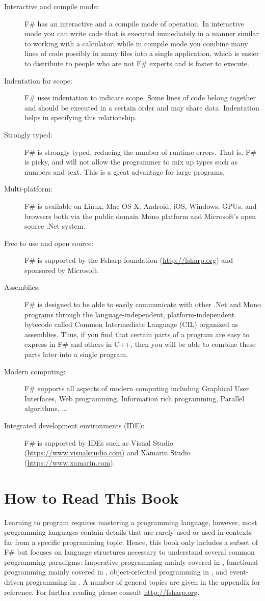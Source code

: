 \documentclass[springer.tex]{subfiles}
\begin{document}
\begin{description}
\item[Interactive and compile mode:] F\# has an interactive and a compile mode of operation. In interactive mode you can write code that is executed immediately in a manner similar to working with a calculator, while in compile mode you combine many lines of code possibly in many files into a single application, which is easier to distribute to people who are not F\# experts and is faster to execute.
\item[Indentation for scope:] F\# uses indentation to indicate scope. Some lines of code belong together and should be executed in a certain order and may share data. Indentation helps in specifying this relationship.
\item[Strongly typed:] F\# is strongly typed, reducing the number of runtime errors. That is, F\# is picky, and will not allow the programmer to mix up types such as numbers and text. This is a great advantage for large programs.
\item[Multi-platform:] F\# is available on Linux, Mac OS X, Android, iOS, Windows, GPUs, and browsers both via the public domain Mono platform and Microsoft's open source .Net system.
\item[Free to use and open source:] F\# is supported by the Fsharp foundation (\url{http://fsharp.org}) and sponsored by Microsoft.
\item[Assemblies:] F\# is designed to be able to easily communicate with other .Net and Mono programs through the language-independent, platform-independent bytecode called Common Intermediate Language (CIL) organized as assemblies. Thus, if you find that certain parts of a program are easy to express in F\# and others in C++, then you will be able to combine these parts later into a single program.
\item[Modern computing:] F\# supports all aspects of modern computing including Graphical User Interfaces, Web programming, Information rich programming, Parallel algorithms, \dots
\item[Integrated development environments (IDE):] F\# is supported by IDEs such as Visual Studio (\url{https://www.visualstudio.com}) and Xamarin Studio (\url{https://www.xamarin.com}).
\end{description}

\section{How to Read This Book}
Learning to program requires mastering a programming language, however, most programming languages contain details that are rarely used or used in contexts far from a specific programming topic. Hence, this book only includes a subset of F\# but focuses on language structures necessary to understand several common programming paradigms: Imperative programming mainly covered in , functional programming mainly covered in , object-oriented programming in , and event-driven programming in .  A number of general topics are given in the appendix for reference. For further reading please consult \url{http://fsharp.org}.
\end{document}
